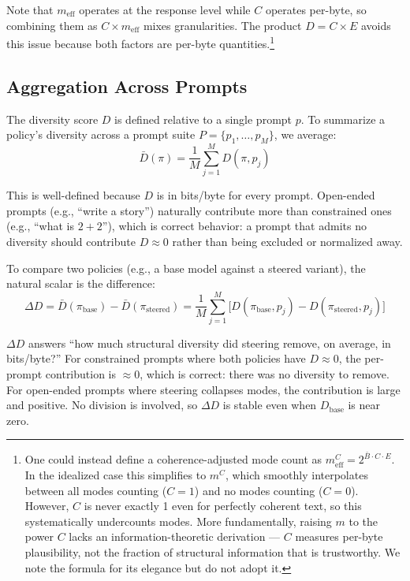 \documentclass[11pt]{article}
\begin{document}
Note that $m_{\mathrm{eff}}$ operates at the response level while $C$ operates per-byte, so combining them as $C \times m_{\mathrm{eff}}$ mixes granularities. The product $D = C \times E$ avoids this issue because both factors are per-byte quantities.\footnote{One could instead define a coherence-adjusted mode count as $m_{\mathrm{eff}}^C = 2^{\bar{B} \cdot C \cdot E}$. In the idealized case this simplifies to $m^C$, which smoothly interpolates between all modes counting ($C = 1$) and no modes counting ($C = 0$). However, $C$ is never exactly 1 even for perfectly coherent text, so this systematically undercounts modes. More fundamentally, raising $m$ to the power $C$ lacks an information-theoretic derivation --- $C$ measures per-byte plausibility, not the fraction of structural information that is trustworthy. We note the formula for its elegance but do not adopt it.}

\subsection{Aggregation Across Prompts}\label{sec:aggregation}

The diversity score $D$ is defined relative to a single prompt $p$. To summarize a policy's diversity across a prompt suite $P = \{p_1, \ldots, p_M\}$, we average:
\begin{equation}
    \bar{D}(\pi) = \frac{1}{M}\sum_{j=1}^{M} D(\pi, p_j)
\end{equation}

This is well-defined because $D$ is in bits/byte for every prompt. Open-ended prompts (e.g., ``write a story'') naturally contribute more than constrained ones (e.g., ``what is $2+2$''), which is correct behavior: a prompt that admits no diversity should contribute $D \approx 0$ rather than being excluded or normalized away.

To compare two policies (e.g., a base model against a steered variant), the natural scalar is the difference:
\begin{equation}
    \Delta D = \bar{D}(\pi_{\mathrm{base}}) - \bar{D}(\pi_{\mathrm{steered}}) = \frac{1}{M}\sum_{j=1}^{M}\bigl[D(\pi_{\mathrm{base}}, p_j) - D(\pi_{\mathrm{steered}}, p_j)\bigr]
\end{equation}

$\Delta D$ answers ``how much structural diversity did steering remove, on average, in bits/byte?'' For constrained prompts where both policies have $D \approx 0$, the per-prompt contribution is $\approx 0$, which is correct: there was no diversity to remove. For open-ended prompts where steering collapses modes, the contribution is large and positive. No division is involved, so $\Delta D$ is stable even when $D_{\mathrm{base}}$ is near zero.
\end{document}
